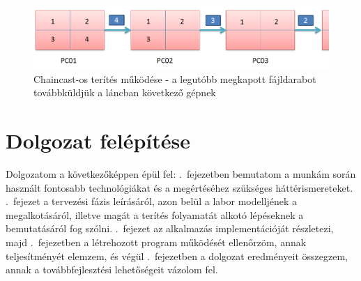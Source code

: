 \begin{figure}[ht]
\centering
\includegraphics[width=140mm, keepaspectratio]{figures/chaincast.png}
\caption{Chaincast-os terítés működése - a legutóbb megkapott fájldarabot továbbküldjük a láncban következő gépnek}
\label{fig:chaincast}
\end{figure}

\section{Dolgozat felépítése}

Dolgozatom a következőképpen épül fel:
.~fejezetben bemutatom a munkám során használt fontosabb technológiákat és a megértéséhez szükséges háttérismereteket. .~fejezet a tervezési fázis leírásáról, azon belül a labor modelljének a megalkotásáról, illetve magát a terítés folyamatát alkotó lépéseknek a bemutatásáról fog szólni. .~fejezet az alkalmazás implementációját részletezi, majd .~fejezetben a létrehozott program működését ellenőrzöm, annak teljesítményét elemzem, és végül .~fejezetben a dolgozat eredményeit összegzem, annak a továbbfejlesztési lehetőségeit vázolom fel.

